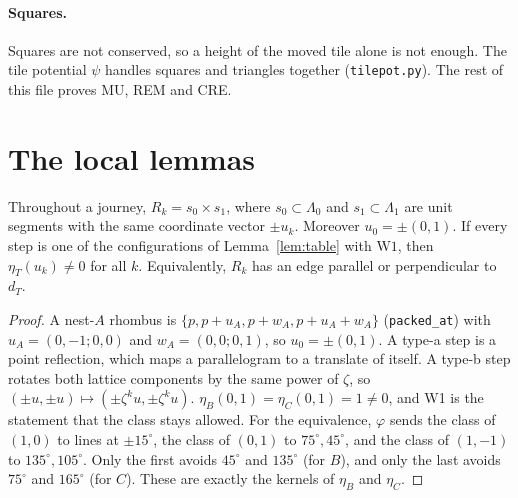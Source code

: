 \documentclass[11pt]{article}
\theoremstyle{definition}\newtheorem{definition}[theorem]{Definition}\newtheorem{remark}[theorem]{Remark}
\begin{document}
\paragraph{Squares.} Squares are not conserved, so a height of the moved tile alone is not enough. The tile potential $\psi$ handles squares and triangles together (\texttt{tilepot.py}). The rest of this file proves MU, REM and CRE.

\section{The local lemmas}\label{sec:local}
\begin{lemma}\label{lem:class}
Throughout a journey, $R_k=s_0\times s_1$, where $s_0\subset\Lambda_0$ and $s_1\subset\Lambda_1$ are unit segments with the same coordinate vector $\pm u_k$. Moreover $u_0=\pm(0,1)$.
If every step is one of the configurations of Lemma~\ref{lem:table} with $\mathrm{W1}$, then $\eta_T(u_k)\ne0$ for all $k$. Equivalently, $R_k$ has an edge parallel or perpendicular to $d_T$.
\end{lemma}
\begin{proof}
A nest-$A$ rhombus is $\{p,p+u_A,p+w_A,p+u_A+w_A\}$ (\texttt{packed\_at}) with $u_A=(0,-1;0,0)$ and $w_A=(0,0;0,1)$, so $u_0=\pm(0,1)$.
A type-a step is a point reflection, which maps a parallelogram to a translate of itself. A type-b step rotates both lattice components by the same power of $\zeta$, so $(\pm u,\pm u)\mapsto(\pm\zeta^ku,\pm\zeta^ku)$.
$\eta_B(0,1)=\eta_C(0,1)=1\ne0$, and W1 is the statement that the class stays allowed.
For the equivalence, $\varphi$ sends the class of $(1,0)$ to lines at $\pm15^\circ$, the class of $(0,1)$ to $75^\circ,45^\circ$, and the class of $(1,-1)$ to $135^\circ,105^\circ$. Only the first avoids $45^\circ$ and $135^\circ$ (for $B$), and only the last avoids $75^\circ$ and $165^\circ$ (for $C$). These are exactly the kernels of $\eta_B$ and $\eta_C$.
\end{proof}
\end{document}
